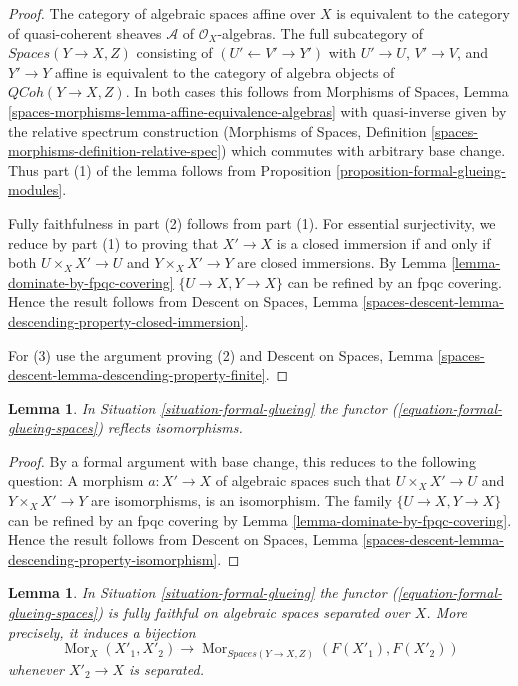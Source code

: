 \documentclass{stacks-project}
\theoremstyle{plain}
\newtheorem{lemma}[subsection]{Lemma}
\theoremstyle{definition}
\theoremstyle{remark}
\numberwithin{equation}{subsection}
\def\Mor{\mathop{\mathrm{Mor}}\nolimits}
\def\QCoh{\mathit{QCoh}}
\begin{document}
\begin{proof}
The category of algebraic spaces affine over $X$ is equivalent to the
category of quasi-coherent sheaves $\mathcal{A}$ of $\mathcal{O}_X$-algebras.
The full subcategory of $\textit{Spaces}(Y \to X, Z)$ consisting of
$(U' \leftarrow V' \rightarrow Y')$ with $U' \to U$, $V' \to V$,
and $Y' \to Y$ affine is equivalent to the category of
algebra objects of $\QCoh(Y \to X, Z)$. In both cases this follows
from Morphisms of Spaces, Lemma
\ref{spaces-morphisms-lemma-affine-equivalence-algebras}
with quasi-inverse given by the relative spectrum construction
(Morphisms of Spaces, Definition
\ref{spaces-morphisms-definition-relative-spec})
which commutes with arbitrary base change. Thus part (1) of the
lemma follows from Proposition \ref{proposition-formal-glueing-modules}.

\medskip\noindent
Fully faithfulness in part (2) follows from part (1). For essential
surjectivity, we reduce by part (1) to proving that $X' \to X$
is a closed immersion if and only if both $U \times_X X' \to U$ and
$Y \times_X X' \to Y$ are closed immersions. By
Lemma \ref{lemma-dominate-by-fpqc-covering}
$\{U \to X, Y \to X\}$ can be refined by an fpqc covering.
Hence the result follows from
Descent on Spaces, Lemma
\ref{spaces-descent-lemma-descending-property-closed-immersion}.

\medskip\noindent
For (3) use the argument proving (2) and
Descent on Spaces, Lemma
\ref{spaces-descent-lemma-descending-property-finite}.
\end{proof}

\begin{lemma}
\label{lemma-reflects-isomorphisms}
In Situation \ref{situation-formal-glueing} the functor
(\ref{equation-formal-glueing-spaces}) reflects isomorphisms.
\end{lemma}

\begin{proof}
By a formal argument with base change, this reduces to the following
question: A morphism $a : X' \to X$ of algebraic spaces such that
$U \times_X X' \to U$ and $Y \times_X X' \to Y$ are isomorphisms, is
an isomorphism. The family $\{U \to X, Y \to X\}$ can be refined by
an fpqc covering by Lemma \ref{lemma-dominate-by-fpqc-covering}.
Hence the result follows from
Descent on Spaces, Lemma
\ref{spaces-descent-lemma-descending-property-isomorphism}.
\end{proof}

\begin{lemma}
\label{lemma-fully-faithful-on-separated}
In Situation \ref{situation-formal-glueing} the functor
(\ref{equation-formal-glueing-spaces}) is fully faithful
on algebraic spaces separated over $X$. More precisely, it induces
a bijection
$$
\Mor_X(X'_1, X'_2)
\longrightarrow
\Mor_{\textit{Spaces}(Y \to X, Z)}(F(X'_1), F(X'_2))
$$
whenever $X'_2 \to X$ is separated.
\end{lemma}
\end{document}
